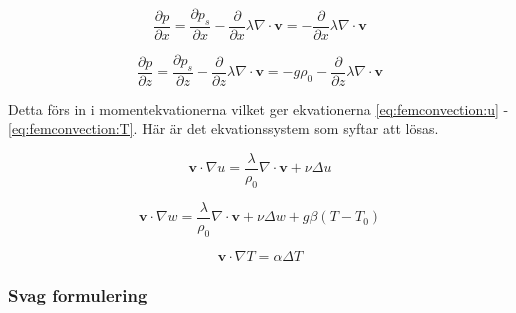 \begin{equation}
\label{eq:femconvection:partx}
\frac{\partial p}{\partial x} = \frac{\partial p_s}{\partial x} -
\frac{\partial}{\partial x} \lambda\nabla\cdot\mathbf{v} = -
\frac{\partial}{\partial x} \lambda\nabla\cdot\mathbf{v}
\end{equation}

\begin{equation}
\label{eq:femconvection:partz}
\frac{\partial p}{\partial z} = \frac{\partial p_s}{\partial z} -
\frac{\partial}{\partial z} \lambda\nabla\cdot\mathbf{v} =
-g\rho_0 - \frac{\partial}{\partial z} \lambda\nabla\cdot\mathbf{v}
\end{equation}

\noindent
Detta förs in i momentekvationerna vilket ger ekvationerna \eqref{eq:femconvection:u} -
\eqref{eq:femconvection:T}. Här är det ekvationssystem som syftar att lösas.

\begin{equation}
\label{eq:femconvection:u}
\mathbf{v}\cdot\nabla u =
\frac{\lambda}{\rho_0}\nabla\cdot\mathbf{v} +
\nu\Delta u
\end{equation}

\begin{equation}
\label{eq:femconvection:w}
\mathbf{v}\cdot\nabla w =
\frac{\lambda}{\rho_0}\nabla\cdot\mathbf{v} + \nu\Delta w +g\beta(T-T_0)
\end{equation}

\begin{equation}
\label{eq:femconvection:T}
\mathbf{v}\cdot\nabla T = \alpha\Delta T
\end{equation}


\subsubsection{Svag formulering}


